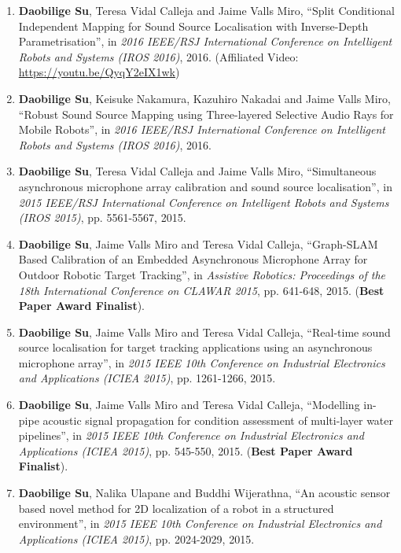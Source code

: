 \documentclass[margin,line]{res}
\begin{document}
\begin{resume}
\begin{enumerate}
\item {\bf Daobilige Su}, Teresa Vidal Calleja and Jaime Valls Miro, ``Split Conditional Independent Mapping for Sound Source Localisation with Inverse-Depth Parametrisation'', in {\it 2016 IEEE/RSJ International Conference on Intelligent Robots and Systems (IROS 2016)}, %
2016. (Affiliated Video: \href{https://youtu.be/QyqY2eIX1wk}{{https://youtu.be/QyqY2eIX1wk}})

\item {\bf Daobilige Su}, Keisuke Nakamura, Kazuhiro Nakadai and Jaime Valls Miro, ``Robust Sound Source Mapping using Three-layered Selective Audio Rays for Mobile Robots'', in {\it 2016 IEEE/RSJ International Conference on Intelligent Robots and Systems (IROS 2016)}, %
2016.

\item {\bf Daobilige Su}, Teresa Vidal Calleja and Jaime Valls Miro, ``Simultaneous asynchronous microphone array calibration and sound source localisation'', in {\it 2015 IEEE/RSJ International Conference on Intelligent Robots and Systems (IROS 2015)}, pp. 5561-5567, 2015.

\item {\bf Daobilige Su}, Jaime Valls Miro and Teresa Vidal Calleja, ``Graph-SLAM Based Calibration of an Embedded Asynchronous Microphone Array for Outdoor Robotic Target Tracking'', in {\it Assistive Robotics: Proceedings of the 18th International Conference on CLAWAR 2015}, pp. 641-648, 2015. ({\bf Best Paper Award Finalist}).

\item {\bf Daobilige Su}, Jaime Valls Miro and Teresa Vidal Calleja, ``Real-time sound source localisation for target tracking applications using an asynchronous microphone array'', in {\it 2015 IEEE 10th Conference on Industrial Electronics and Applications (ICIEA 2015)}, pp. 1261-1266, 2015.

\item {\bf Daobilige Su}, Jaime Valls Miro and Teresa Vidal Calleja, ``Modelling in-pipe acoustic signal propagation for condition assessment of multi-layer water pipelines'', in {\it 2015 IEEE 10th Conference on Industrial Electronics and Applications (ICIEA 2015)}, pp. 545-550, 2015. ({\bf Best Paper Award Finalist}).

\item {\bf Daobilige Su}, Nalika Ulapane and Buddhi Wijerathna, ``An acoustic sensor based novel method for 2D localization of a robot in a structured environment'', in {\it 2015 IEEE 10th Conference on Industrial Electronics and Applications (ICIEA 2015)}, pp. 2024-2029, 2015.


\end{enumerate}
\end{resume}
\end{document}
